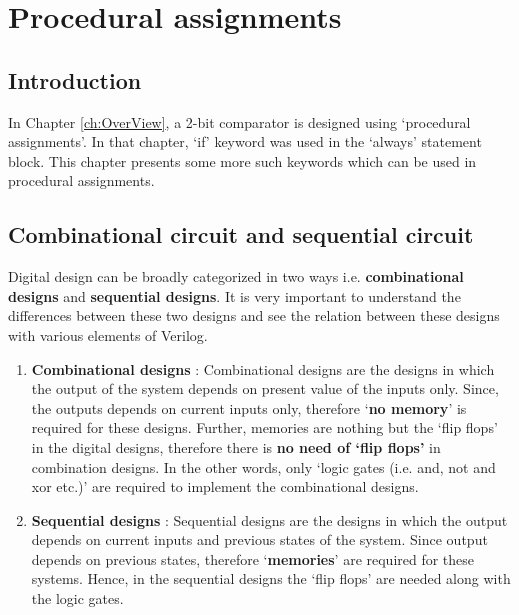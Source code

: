\chapter{Procedural assignments} \label{ch:behavioralModeling}

\graphicspath{{Chapters/ProceduralAssignments/Figures/}}

\section{Introduction}
In Chapter \ref{ch:OverView}, a 2-bit comparator is designed using `procedural assignments'. In that chapter, `if' keyword was used in the `always' statement block. This chapter presents some more such keywords which can be used in procedural assignments. 

\section{Combinational circuit and sequential circuit}\label{sec:combSeqCircuit}

Digital design can be broadly categorized in two ways i.e. \textbf{combinational designs} and \textbf{sequential designs}. It is very important to understand the differences between these two designs and see the relation between these designs with various elements of Verilog. 
\begin{enumerate}
	\item \textbf{Combinational designs} : Combinational designs are the designs in which the output of the system depends on present value of the inputs only. Since, the outputs depends on current inputs only, therefore `\textbf{no memory}' is required for these designs. Further, memories are nothing but the `flip flops' in the digital designs, therefore there is \textbf{no need of `flip flops'} in combination designs. In the other words, only `logic gates (i.e. and, not and xor etc.)' are required to implement the combinational designs.
	
	\item \textbf{Sequential designs} : Sequential designs are the designs in which the output depends on current inputs and previous states of the system. Since output depends on previous states, therefore `\textbf{memories}' are required for these systems. Hence, in the sequential designs the `flip flops' are needed along with the logic gates. 
\end{enumerate}

